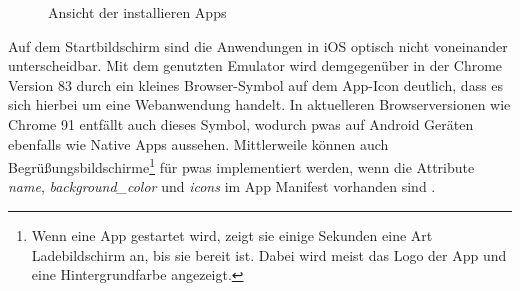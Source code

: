 \begin{figure}[h]
\caption{Ansicht der installieren Apps}
\label{fig:pwa_rn_installed}
\end{figure}

Auf dem Startbildschirm sind die Anwendungen in iOS optisch nicht voneinander unterscheidbar.
Mit dem genutzten Emulator wird demgegenüber in der Chrome Version 83 durch ein kleines Browser-Symbol auf dem App-Icon deutlich, dass es sich hierbei um eine Webanwendung handelt.
In aktuelleren Browserversionen wie Chrome 91 entfällt auch dieses Symbol, wodurch \acp{pwa} auf Android Geräten ebenfalls wie Native Apps aussehen.
Mittlerweile können auch Begrüßungsbildschirme\footnote{Wenn eine App gestartet wird, zeigt sie einige Sekunden eine Art Ladebildschirm an, bis sie bereit ist.
Dabei wird meist das Logo der App und eine Hintergrundfarbe angezeigt.} für \acp{pwa} implementiert werden, wenn die Attribute \textit{name}, \textit{background\_color} und \textit{icons} im App Manifest vorhanden sind \cite{LePage.2021}.

